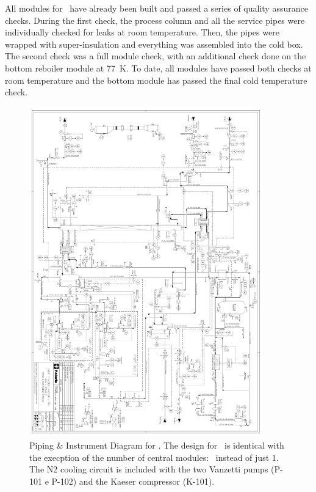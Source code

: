 All modules for \SeruciOne\ have already been built and passed a series of quality assurance checks.  During the first check, the process column and all the service pipes were individually checked for leaks at room temperature.  Then, the pipes were wrapped with super-insulation and everything was assembled into the cold box.  The second check was a full module check, with an additional check done on the bottom reboiler module at \SI{77}{\kelvin}.  To date, all modules have passed both checks at room temperature and the bottom module has passed the final cold temperature check.  

\begin{figure}[!t]
\centering
\includegraphics[width=0.9\textwidth]{./Figures/Seruci0_column_PandID.pdf}
\caption[P\& ID of \Aria]{Piping \& Instrument Diagram for \SeruciZero. The design for \SeruciOne\ is identical with the execption of the number of central modules: \AriaCentralModulesNumber\ instead of just 1. The N2 cooling circuit is included with the two Vanzetti pumps (P-101 e P-102) and the Kaeser compressor (K-101).}
\label{fig:Aria-PandID}
\end{figure}

